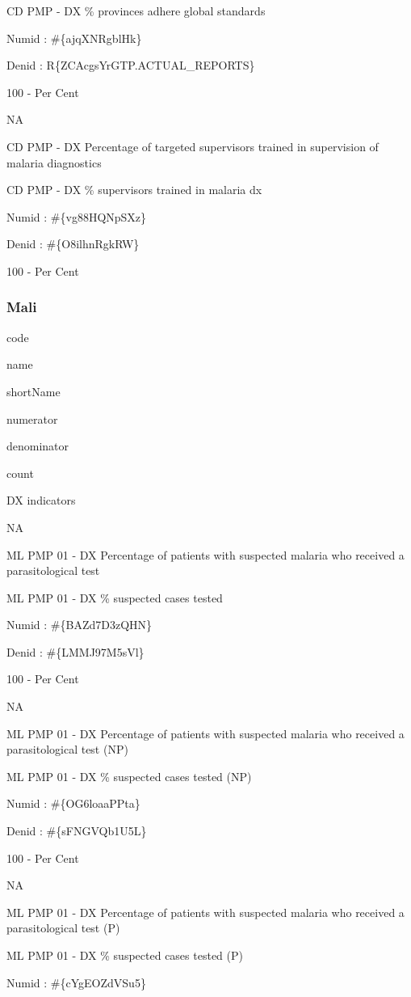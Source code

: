 \documentclass[]{book}
\begin{document}
CD PMP - DX \% provinces adhere global standards

Numid : \#\{ajqXNRgblHk\}

Denid : R\{ZCAcgsYrGTP.ACTUAL\_REPORTS\}

100 - Per Cent

NA

CD PMP - DX Percentage of targeted supervisors trained in supervision of malaria diagnostics

CD PMP - DX \% supervisors trained in malaria dx

Numid : \#\{vg88HQNpSXz\}

Denid : \#\{O8ilhnRgkRW\}

100 - Per Cent

\hypertarget{mali}{%
\subsubsection{Mali}\label{mali}}

code

name

shortName

numerator

denominator

count

DX indicators

NA

ML PMP 01 - DX Percentage of patients with suspected malaria who received a parasitological test

ML PMP 01 - DX \% suspected cases tested

Numid : \#\{BAZd7D3zQHN\}

Denid : \#\{LMMJ97M5sVl\}

100 - Per Cent

NA

ML PMP 01 - DX Percentage of patients with suspected malaria who received a parasitological test (NP)

ML PMP 01 - DX \% suspected cases tested (NP)

Numid : \#\{OG6loaaPPta\}

Denid : \#\{sFNGVQb1U5L\}

100 - Per Cent

NA

ML PMP 01 - DX Percentage of patients with suspected malaria who received a parasitological test (P)

ML PMP 01 - DX \% suspected cases tested (P)

Numid : \#\{cYgEOZdVSu5\}
\end{document}
